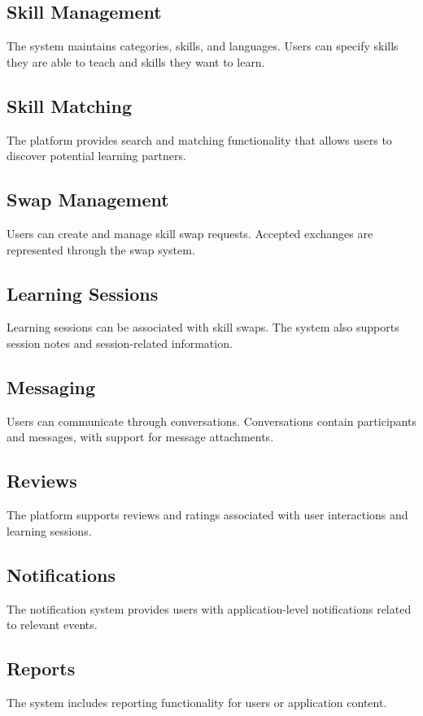 \documentclass[12pt,a4paper]{report}
\begin{document}
\subsection{Skill Management}
The system maintains categories, skills, and languages.  Users can specify skills
they are able to teach and skills they want to learn.

\subsection{Skill Matching}
The platform provides search and matching functionality that allows users to
discover potential learning partners.

\subsection{Swap Management}
Users can create and manage skill swap requests.  Accepted exchanges are
represented through the swap system.

\subsection{Learning Sessions}
Learning sessions can be associated with skill swaps.  The system also supports
session notes and session-related information.

\subsection{Messaging}
Users can communicate through conversations.  Conversations contain participants
and messages, with support for message attachments.

\subsection{Reviews}
The platform supports reviews and ratings associated with user interactions and
learning sessions.

\subsection{Notifications}
The notification system provides users with application-level notifications
related to relevant events.

\subsection{Reports}
The system includes reporting functionality for users or application content.
\end{document}
